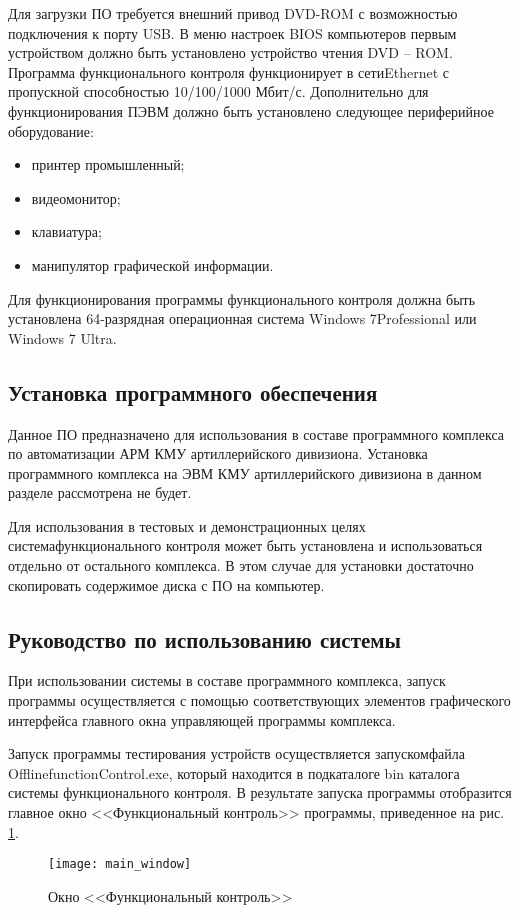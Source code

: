 Для загрузки ПО требуется внешний привод DVD-ROM с возможностью подключения к порту USB.
В меню настроек BIOS компьютеров первым устройством должно быть установлено устройство чтения DVD -- ROM.
Программа функционального контроля функционирует в сети\break Ethernet с пропускной способностью 10/100/1000 Мбит/с.
Дополнительно для функционирования ПЭВМ должно быть установлено следующее периферийное оборудование:

\begin{itemize}
	\item принтер промышленный;
	\item видеомонитор;
	\item клавиатура;
	\item манипулятор графической информации.
\end{itemize}

Для функционирования программы функционального контроля должна быть установлена 64-разрядная
операционная система Windows 7\break Professional или Windows 7 Ultra.

\subsection{Установка программного обеспечения}
\label{sub:guide:intstallation}

Данное ПО предназначено для использования в составе программного комплекса по автоматизации АРМ КМУ
артиллерийского дивизиона.
Установка программного комплекса на ЭВМ КМУ артиллерийского дивизиона в данном разделе
рассмотрена не будет.

Для использования в тестовых и демонстрационных целях система\break функционального контроля может быть установлена и
использоваться отдельно от остального комплекса.
В этом случае для установки достаточно скопировать содержимое диска
с ПО на компьютер.

\subsection{Руководство по использованию системы}
\label{sub:guide:user_guide}

При использовании системы в составе программного комплекса, запуск программы осуществляется с помощью соответствующих
элементов графического интерфейса главного окна управляющей программы комплекса.

Запуск программы тестирования устройств
осуществляется запуском\break файла OfflinefunctionControl.exe, который находится в
подкаталоге bin каталога системы функционального контроля.
В результате запуска программы отобразится главное окно <<Функциональный контроль>> программы, приведенное на рис.
\ref{fig:guide:user_guide:main_window}.
\begin{figure}
	\centering
	\texttt{[image: main\_window]}
	\caption{Окно <<Функциональный контроль>>}
	\label{fig:guide:user_guide:main_window}
\end{figure}

